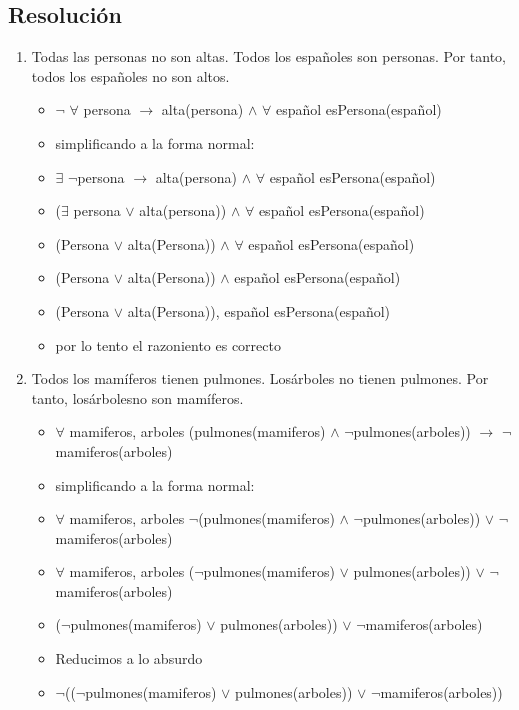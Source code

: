 \documentclass[a4paper,10pt]{article}
\begin{document}
\subsection{Resolución}
\begin{enumerate}
	\item Todas las personas no son altas. Todos los españoles son personas. Por tanto, todos los españoles no son altos.
	\begin{itemize}
		\item $\lnot$ $\forall$ persona $\rightarrow$ alta(persona) $\land$ $\forall$ español esPersona(español)
		\item simplificando a la forma normal:
		\item $\exists$ $\lnot$persona $\rightarrow$ alta(persona) $\land$ $\forall$ español esPersona(español)
		\item ($\exists$ persona $\lor$ alta(persona)) $\land$ $\forall$ español esPersona(español)
		\item (Persona $\lor$ alta(Persona)) $\land$ $\forall$ español esPersona(español)
		\item (Persona $\lor$ alta(Persona)) $\land$ español esPersona(español)
		\item (Persona $\lor$ alta(Persona)), español esPersona(español)
		\item por lo tento el razoniento es correcto
	\end{itemize}
	\item Todos los mamíferos tienen pulmones. Losárboles no tienen pulmones. Por tanto, losárbolesno son mamíferos.
	\begin{itemize}
		\item $\forall$ mamiferos, arboles (pulmones(mamiferos) $\land$ $\lnot$pulmones(arboles)) $\rightarrow$ $\lnot$mamiferos(arboles)
		\item simplificando a la forma normal:
		\item $\forall$ mamiferos, arboles $\lnot$(pulmones(mamiferos) $\land$ $\lnot$pulmones(arboles)) $\lor$ $\lnot$mamiferos(arboles)
		\item $\forall$ mamiferos, arboles ($\lnot$pulmones(mamiferos) $\lor$ pulmones(arboles)) $\lor$ $\lnot$mamiferos(arboles)
		\item ($\lnot$pulmones(mamiferos) $\lor$ pulmones(arboles)) $\lor$ $\lnot$mamiferos(arboles)
		\item Reducimos a lo absurdo
		\item $\lnot$(($\lnot$pulmones(mamiferos) $\lor$ pulmones(arboles)) $\lor$ $\lnot$mamiferos(arboles))

\end{itemize}
\end{enumerate}
\end{document}
